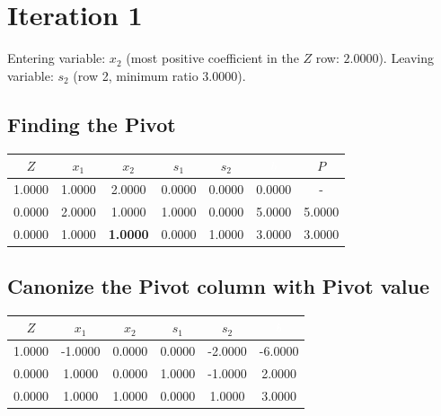 \section*{Iteration 1}
Entering variable: $x_{2}$ (most positive coefficient in the $Z$ row: $2.0000$). Leaving variable: $s_{2}$ (row 2, minimum ratio $3.0000$).

\subsection*{Finding the Pivot}
\begin{table}[H]
\centering
\begin{tabular}{|c|c|c|c|c|c|c|}
\hline
\cellcolor{red} $Z$ & \cellcolor{orange} $x_{1}$ & \cellcolor{orange} $x_{2}$ & \cellcolor{yellow} $s_{1}$ & \cellcolor{yellow} $s_{2}$ & \cellcolor{black} \textcolor{white}{$b$} & $P$ \\ 
\hline
1.0000 & 1.0000 & \cellcolor{green!20} 2.0000 & 0.0000 & 0.0000 & 0.0000 & - \\ 
\hline
0.0000 & 2.0000 & \cellcolor{green!20} 1.0000 & 1.0000 & 0.0000 & 5.0000 & 5.0000 \\ 
\hline
0.0000 & 1.0000 & \cellcolor{green} \textbf{1.0000} & 0.0000 & 1.0000 & 3.0000 & 3.0000 \\ 
\hline
\end{tabular}
\end{table}
\subsection*{Canonize the Pivot column with Pivot value}
\begin{table}[H]
\centering
\begin{tabular}{|c|c|c|c|c|c|}
\hline
\cellcolor{red} $Z$ & \cellcolor{orange} $x_{1}$ & \cellcolor{orange} $x_{2}$ & \cellcolor{yellow} $s_{1}$ & \cellcolor{yellow} $s_{2}$ & \cellcolor{black} \textcolor{white}{$b$} \\ 
\hline
1.0000 & -1.0000 & 0.0000 & 0.0000 & -2.0000 & -6.0000 \\ 
\hline
0.0000 & 1.0000 & 0.0000 & 1.0000 & -1.0000 & 2.0000 \\ 
\hline
0.0000 & 1.0000 & 1.0000 & 0.0000 & 1.0000 & 3.0000 \\ 
\hline
\end{tabular}
\end{table}
\newpage
